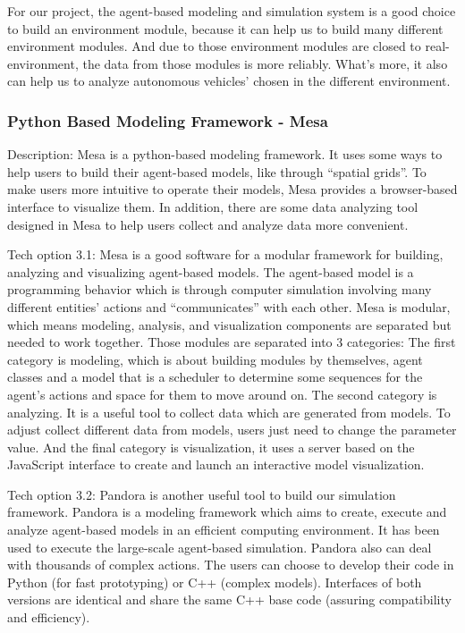 \documentclass[onecolumn, draftclsnofoot,10pt, compsoc]{IEEEtran}
\begin{document}
For our project, the agent-based modeling and simulation system is a good choice to build an environment module, because it can help us to build many different environment modules.
And due to those environment modules are closed to real-environment, the data from those modules is more reliably.
What’s more, it also can help us to analyze autonomous vehicles’ chosen in the different environment.
\subsubsection{Python Based Modeling Framework - Mesa}
Description: Mesa is a python-based modeling framework.
It uses some ways to help users to build their agent-based models, like through “spatial grids”.
To make users more intuitive to operate their models, Mesa provides a browser-based interface to visualize them.
In addition, there are some data analyzing tool designed in Mesa to help users collect and analyze data more convenient.

Tech option 3.1: Mesa is a good software for a modular framework for building, analyzing and visualizing agent-based models.
The agent-based model is a programming behavior which is through computer simulation involving many different entities’ actions and “communicates” with each other.
Mesa is modular, which means modeling, analysis, and visualization components are separated but needed to work together.
Those modules are separated into 3 categories:
The first category is modeling, which is about building modules by themselves, agent classes and a model that is a scheduler to determine some sequences for the agent’s actions and space for them to move around on.
The second category is analyzing.
It is a useful tool to collect data which are generated from models.
To adjust collect different data from models, users just need to change the parameter value.
And the final category is visualization, it uses a server based on the JavaScript interface to create and launch an interactive model visualization.

Tech option 3.2: Pandora is another useful tool to build our simulation framework.
Pandora is a modeling framework which aims to create, execute and analyze agent-based models in an efficient computing environment.
It has been used to execute the large-scale agent-based simulation.
Pandora also can deal with thousands of complex actions.
The users can choose to develop their code in Python (for fast prototyping) or C++ (complex models).
Interfaces of both versions are identical and share the same C++ base code (assuring compatibility and efficiency).
\end{document}
